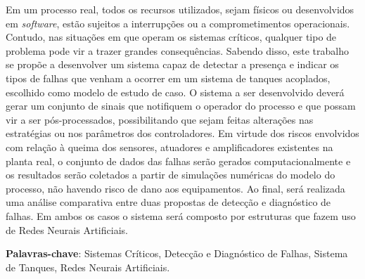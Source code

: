 Em um processo real, todos os recursos utilizados, sejam físicos ou
desenvolvidos em {\it software}, estão sujeitos a interrupções ou a
comprometimentos operacionais. Contudo, nas situações em que operam os
sistemas críticos, qualquer tipo de problema pode vir a trazer grandes
consequências. Sabendo disso, este trabalho se propõe a desenvolver um sistema
capaz de detectar a presença e indicar os tipos de falhas que venham a ocorrer
em um sistema de tanques acoplados, escolhido como modelo de estudo de caso. O
sistema a ser desenvolvido deverá gerar um conjunto de sinais que notifiquem o
operador do processo e que possam vir a ser pós-processados, possibilitando que
sejam feitas alterações nas estratégias ou nos parâmetros dos controladores. Em
virtude dos riscos envolvidos com relação à queima dos sensores, atuadores e
amplificadores existentes na planta real, o conjunto de dados das falhas serão
gerados computacionalmente e os resultados serão coletados a partir de
simulações numéricas do modelo do processo, não havendo risco de dano aos
equipamentos. Ao final, será realizada uma análise comparativa entre duas
propostas de detecção e diagnóstico de falhas. Em ambos os casos o sistema será
composto por estruturas que fazem uso de Redes Neurais Artificiais.

\vspace{1.5ex}

{\bf Palavras-chave}: Sistemas Críticos, Detecção e Diagnóstico de Falhas,
Sistema de Tanques, Redes Neurais Artificiais.
